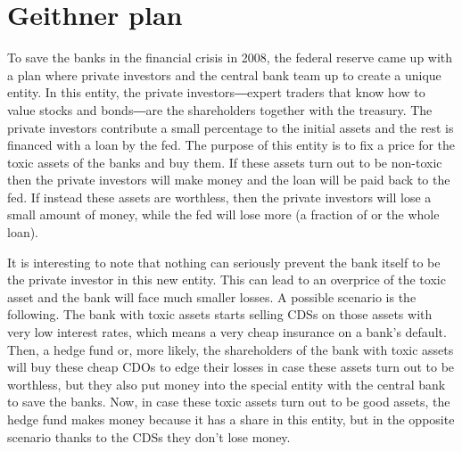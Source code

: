 \section{Geithner plan}
To save the banks in the financial crisis in 2008, the federal reserve came up with a plan where private investors and the central bank team up to create a unique entity. In this entity, the private investors―expert traders that know how to value stocks and bonds―are the shareholders together with the treasury. The private investors contribute a small percentage to the initial assets and the rest is financed with a loan by the fed. The purpose of this entity is to fix a price for the toxic assets of the banks and buy them. If these assets turn out to be non-toxic then the private investors will make money and the loan will be paid back to the fed. If instead these assets are worthless, then the private investors will lose a small amount of money, while the fed will lose more (a fraction of or the whole loan). 

It is interesting to note that nothing can seriously prevent the bank itself to be the private investor in this new entity. This can lead to an overprice of the toxic asset and the bank will face much smaller losses. A possible scenario is the following. The bank with toxic assets starts selling CDSs on those assets with very low interest rates, which means a very cheap insurance on a bank's default. Then, a hedge fund or, more likely, the shareholders of the bank with toxic assets will buy these cheap CDOs to edge their losses in case these assets turn out to be worthless, but they also put money into the special entity with the central bank to save the banks. Now, in case these toxic assets turn out to be good assets, the hedge fund makes money because it has a share in this entity, but in the opposite scenario thanks to the CDSs they don't lose money.

